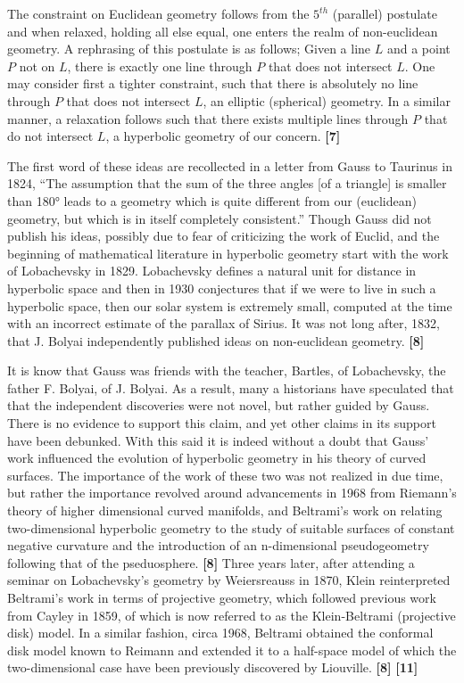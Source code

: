 \documentclass[12pt]{article}
\begin{document}
The constraint on Euclidean geometry follows from the $5^{th}$ (parallel) postulate and when relaxed,
holding all else equal, one enters the realm of non-euclidean geometry.
A rephrasing of this postulate is as follows; Given a line $ L $ and a point $ P $ not on $ L $,
there is exactly one line through $ P $ that does not intersect $ L $.
One may consider first a tighter constraint, such that there is absolutely no line
through $ P $ that does not intersect $ L $, an elliptic (spherical) geometry.
In a similar manner, a relaxation follows such that there exists multiple lines
through $ P $ that do not intersect $ L $, a hyperbolic geometry of our concern. \textbf{[7]}

\hspace{5mm}
The first word of these ideas are recollected in a letter from Gauss to Taurinus in 1824,
``The assumption that the sum of the three angles [of a triangle] is smaller than 180° leads to a geometry
which is quite different from our (euclidean) geometry, but which is in itself completely consistent.''
Though Gauss did not publish his ideas, possibly due to fear of criticizing the work of Euclid,
and the beginning of mathematical literature in hyperbolic geometry start with the work of Lobachevsky in 1829.
Lobachevsky defines a natural unit for distance in hyperbolic space and then in 1930 conjectures that if we were to live
in such a hyperbolic space, then our solar system is extremely small, computed at the time with an incorrect estimate of the parallax of Sirius.
It was not long after, 1832, that J. Bolyai independently published ideas on non-euclidean geometry. \textbf{[8]}

\hspace{5mm}
It is know that Gauss was friends with the teacher, Bartles, of Lobachevsky, the father F. Bolyai, of J. Bolyai.
As a result, many a historians have speculated that that the independent discoveries were not novel, but rather guided by Gauss.
There is no evidence to support this claim, and yet other claims in its support have been debunked.
With this said it is indeed without a doubt that Gauss' work influenced the evolution of hyperbolic geometry in his theory of curved surfaces.
The importance of the work of these two was not realized in due time, but rather the importance revolved around advancements in 1968 from
Riemann's theory of higher dimensional curved manifolds, and Beltrami's work on relating two-dimensional hyperbolic geometry to the
study of suitable surfaces of constant negative curvature and the introduction of an n-dimensional pseudogeometry following that of the pseduosphere. \textbf{[8]}
Three years later, after attending a seminar on Lobachevsky's geometry by Weiersreauss in 1870, Klein reinterpreted Beltrami's work in terms of projective geometry,
which followed previous work from Cayley in 1859, of which is now referred to as the Klein-Beltrami (projective disk) model.
In a similar fashion, circa 1968, Beltrami obtained the conformal disk model known to Reimann and extended it to a half-space model
of which the two-dimensional case have been previously discovered by Liouville. \textbf{[8]} \textbf{[11]}
\end{document}
